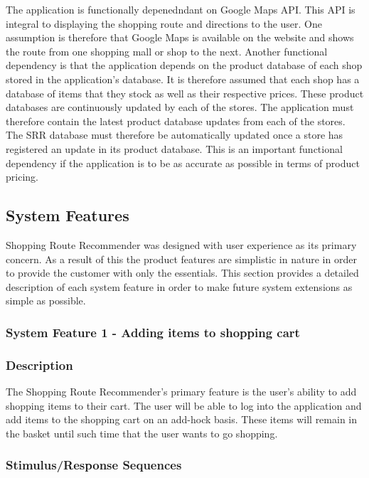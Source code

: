 \documentclass[10pt, a4paper, onecolumn]{scrartcl}
\begin{document}
			The application is functionally depenedndant on Google Maps API. This API is integral to displaying the shopping route and directions to the user. One assumption is therefore that Google Maps is available on the website and shows the route from one shopping mall or shop to the next. Another functional dependency is that the application depends on the product database of each shop stored in the application's database. It is therefore assumed that each shop has a database of items that they stock as well as their respective prices. These product databases are continuously updated by each of the stores. The application must therefore contain the latest product database updates from each of the stores. The SRR database must therefore be automatically updated once a store has registered an update in its product database. This is an important functional dependency if the application is to be as accurate as possible in terms of product pricing. 
	
	\subsection{System Features}
	
		Shopping Route Recommender was designed with user experience as its primary concern. As a result of this the product features are simplistic in nature in order to provide the customer with only the essentials.	This section provides a detailed description of each system feature in order to make future system extensions as simple as possible. 
	
		\subsubsection{System Feature 1 - Adding items to shopping cart}
		\label{featureadd}
		
			\subsubsection*{Description}
			
				The Shopping Route Recommender's primary feature is the user's ability to add shopping items to their cart. The user will be able to log into the application and add items to the shopping cart on an add-hock basis. These items will remain in the basket until such time that the user wants to go shopping. 
			
			\subsubsection*{Stimulus/Response Sequences}
			
\end{document}

